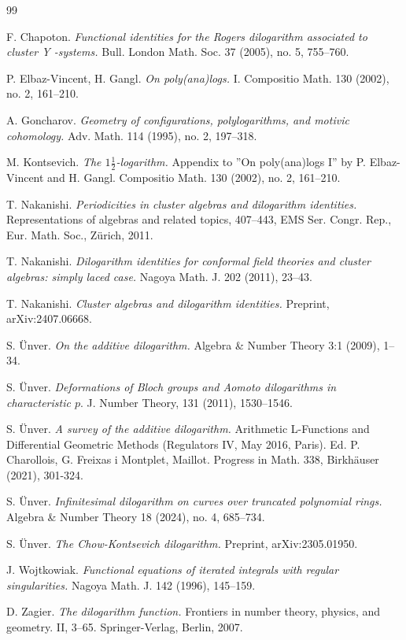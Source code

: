 \documentclass{amsart}
\theoremstyle{definition}
\numberwithin{equation}{subsection}
\begin{document}
\begin{thebibliography}{99}



 F. Chapoton. {\it Functional identities for the Rogers dilogarithm associated to cluster  Y -systems.} Bull. London Math. Soc. 37 (2005), no. 5, 755–760.

 P. Elbaz-Vincent, H. Gangl. {\it On poly(ana)logs.} I. Compositio Math. 130 (2002), no. 2, 161–210.

 A. Goncharov. {\it Geometry of configurations, polylogarithms, and motivic cohomology.}
Adv. Math. 114 (1995), no. 2, 197–318.

 M. Kontsevich. {\it The $1\frac{1}{2}$-logarithm.} Appendix to ”On poly(ana)logs I” by P. Elbaz-Vincent and
H. Gangl. Compositio Math. 130 (2002), no. 2, 161–210.

 T. Nakanishi. {\it 
Periodicities in cluster algebras and dilogarithm identities.} Representations of algebras and related topics, 407–443,
EMS Ser. Congr. Rep., Eur. Math. Soc., Z\"{u}rich, 2011.

 T. Nakanishi. {\it 
Dilogarithm identities for conformal field theories and cluster algebras: simply laced case.} Nagoya Math. J. 202 (2011), 23–43.


 T. Nakanishi. {\it Cluster algebras and dilogarithm identities.} Preprint, arXiv:2407.06668.


 S. \"{U}nver. {\it On the additive dilogarithm.} Algebra \& Number Theory 3:1 (2009), 1–34.

 S. \"{U}nver. {\it Deformations of Bloch groups and Aomoto dilogarithms in characteristic $p.$} J. Number Theory, 131  (2011), 1530–1546.


  S. \"{U}nver. {\it A survey of the additive dilogarithm.} Arithmetic L-Functions and Differential Geometric Methods (Regulators IV, May 2016, Paris). Ed. P. Charollois, G. Freixas i Montplet, Maillot. Progress in Math. 338, Birkhäuser (2021), 301-324.

 S. \"{U}nver. {\it Infinitesimal dilogarithm on curves over truncated polynomial rings.} Algebra \& Number Theory 18 (2024), no. 4, 685–734.

 S. \"{U}nver. {\it The Chow-Kontsevich dilogarithm.} Preprint, arXiv:2305.01950. 

 J. Wojtkowiak. {\it Functional equations of iterated integrals with regular singularities.} Nagoya Math. J. 142 (1996), 145–159.

 D. Zagier. {\it
The dilogarithm function.} Frontiers in number theory, physics, and geometry. II, 3–65.
Springer-Verlag, Berlin, 2007.




\end{thebibliography}
\end{document}
